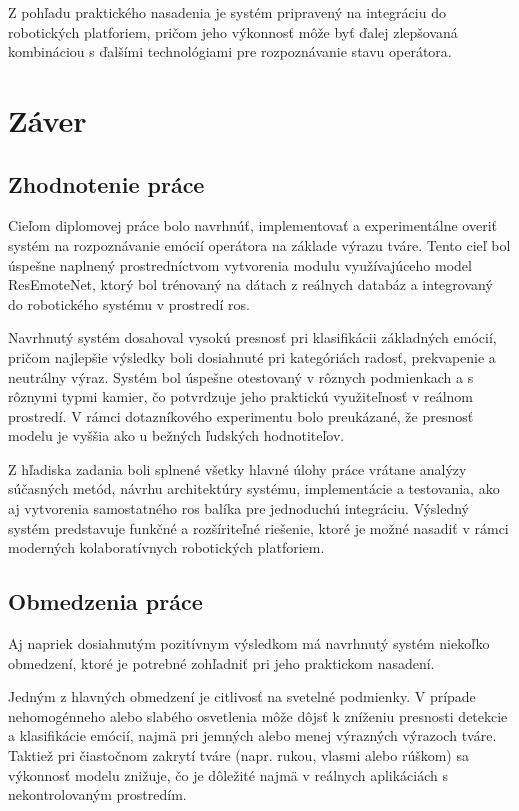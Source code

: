 Z pohľadu praktického nasadenia je systém pripravený na integráciu do robotických platforiem, pričom jeho výkonnosť môže byť ďalej zlepšovaná kombináciou s ďalšími technológiami pre rozpoznávanie stavu operátora.

\section{Záver}
\label{sec:conclusion}
\subsection{Zhodnotenie práce}

Cieľom diplomovej práce bolo navrhnúť, implementovať a experimentálne overiť systém na rozpoznávanie emócií operátora na základe výrazu tváre. Tento cieľ bol úspešne naplnený prostredníctvom vytvorenia modulu využívajúceho model ResEmoteNet, ktorý bol trénovaný na dátach z reálnych databáz a integrovaný do robotického systému v prostredí \gls{ros}.

Navrhnutý systém dosahoval vysokú presnosť pri klasifikácii základných emócií, pričom najlepšie výsledky boli dosiahnuté pri kategóriách radosť, prekvapenie a neutrálny výraz. Systém bol úspešne otestovaný v rôznych podmienkach a s rôznymi typmi kamier, čo potvrdzuje jeho praktickú využiteľnosť v reálnom prostredí. V rámci dotazníkového experimentu bolo preukázané, že presnosť modelu je vyššia ako u bežných ľudských hodnotiteľov.

Z hľadiska zadania boli splnené všetky hlavné úlohy práce vrátane analýzy súčasných metód, návrhu architektúry systému, implementácie a testovania, ako aj vytvorenia samostatného \gls{ros} balíka pre jednoduchú integráciu. Výsledný systém predstavuje funkčné a rozšíriteľné riešenie, ktoré je možné nasadiť v rámci moderných kolaboratívnych robotických platforiem.

\subsection{Obmedzenia práce}

Aj napriek dosiahnutým pozitívnym výsledkom má navrhnutý systém niekoľko obmedzení, ktoré je potrebné zohľadniť pri jeho praktickom nasadení.

Jedným z hlavných obmedzení je citlivosť na svetelné podmienky. V prípade nehomogénneho alebo slabého osvetlenia môže dôjsť k zníženiu presnosti detekcie a klasifikácie emócií, najmä pri jemných alebo menej výrazných výrazoch tváre. Taktiež pri čiastočnom zakrytí tváre (napr. rukou, vlasmi alebo rúškom) sa výkonnosť modelu znižuje, čo je dôležité najmä v reálnych aplikáciách s nekontrolovaným prostredím.

